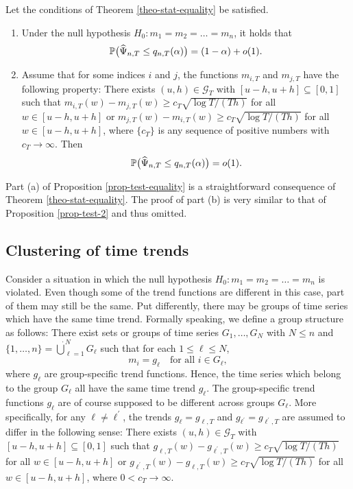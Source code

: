 \begin{prop}\label{prop-test-equality}
Let the conditions  of Theorem \ref{theo-stat-equality} be satisfied. 
\begin{enumerate}[label=(\alph*),leftmargin=0.75cm]
\item Under the null hypothesis $H_0: m_1 = m_2 = \ldots = m_n$, it holds that 
\[ \mathbb{P} \big( \widehat{\Psi}_{n,T} \le q_{n,T}(\alpha) \big) = (1 - \alpha) + o(1). \]
\item Assume that for some indices $i$ and $j$, the functions $m_{i,T}$ and $m_{j,T}$ have the following property: There exists $(u,h) \in \mathcal{G}_T$ with $[u-h,u+h] \subseteq [0,1]$ such that $m_{i,T}(w) - m_{j,T}(w) \ge c_T \sqrt{\log T/(Th)}$ for all $w \in [u-h,u+h]$ or $m_{j,T}(w) - m_{i,T}(w) \ge c_T \sqrt{\log T/(Th)}$ for all $w \in [u-h,u+h]$, where $\{c_T\}$ is any sequence of positive numbers with $c_T \rightarrow \infty$. Then 
\[ \mathbb{P} \big( \widehat{\Psi}_{n,T} \le q_{n,T}(\alpha) \big) = o(1). \]
\end{enumerate}
\end{prop}
Part (a) of Proposition \ref{prop-test-equality} is a straightforward consequence of Theorem \ref{theo-stat-equality}. The proof of part (b) is very similar to that of Proposition \ref{prop-test-2} and thus omitted. 


\subsection{Clustering of time trends}\label{subsec-test-equality-clustering}


Consider a situation in which the null hypothesis $H_0: m_1 = m_2 = \ldots = m_n$ is violated. Even though some of the trend functions are different in this case, part of them may still be the same. Put differently, there may be groups of time series which have the same time trend. Formally speaking, we define a group structure as follows: There exist sets or groups of time series $G_1,\ldots,G_N$ with $N \le n$ and $\{1,\ldots,n\} = \mathbin{\dot{\bigcup}}_{\ell=1}^{N} G_\ell$ such that for each $1 \le \ell \le N$,
\[ m_i = g_\ell \quad \text{for all } i \in G_\ell, \]
where $g_\ell$ are group-specific trend functions. Hence, the time series which belong to the group $G_\ell$ all have the same time trend $g_\ell$. The group-specific trend functions $g_\ell$ are of course supposed to be different across groups $G_\ell$. More specifically, for any $\ell \ne \ell^\prime$, the trends $g_\ell = g_{\ell,T}$ and $g_{\ell^\prime} = g_{\ell^\prime,T}$ are assumed to differ in the following sense: There exists $(u,h) \in \mathcal{G}_T$ with $[u-h,u+h] \subseteq [0,1]$ such that $g_{\ell,T}(w) - g_{\ell^\prime,T}(w) \ge c_T \sqrt{\log T/(Th)}$ for all $w \in [u-h,u+h]$ or $g_{\ell^\prime,T}(w) - g_{\ell,T}(w) \ge c_T \sqrt{\log T/(Th)}$ for all $w \in [u-h,u+h]$, where $0 < c_T \rightarrow \infty$.


